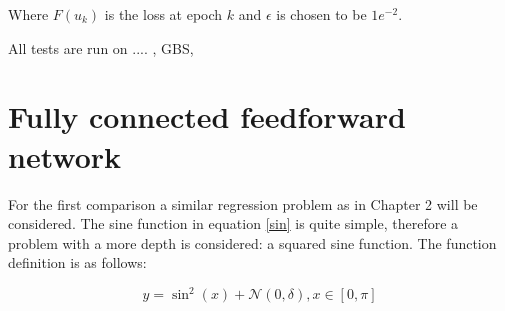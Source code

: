 Where $F(u_k)$ is the loss at epoch $k$ and $\epsilon$ is chosen to be $1e^{-2}$.

All tests are run on .... , GBS,

\section{Fully connected feedforward network}
For the first comparison a similar regression problem as in Chapter 2 will be considered. The sine function in equation \ref{sin} is quite simple, therefore a problem with a more depth is considered: a squared sine function. The function definition is as follows: 

\begin{equation}
y = \sin^2(x) + \mathcal N(0,\delta), x \in [0,\pi]
\label{sin2}
\end{equation}

